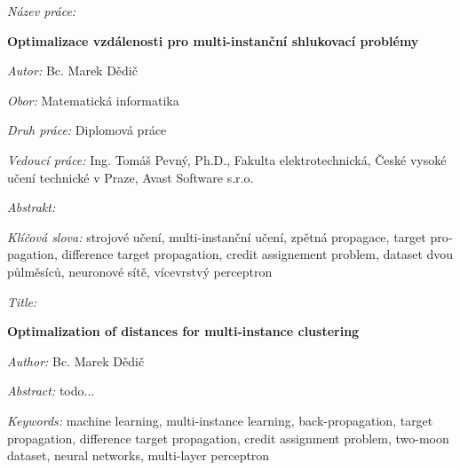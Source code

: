 \begin{czech}
	\begin{onehalfspace}
		\noindent \textit{Název práce:}

		\noindent \textbf{Optimalizace vzdálenosti pro multi-instanční shlukovací problémy}
	\end{onehalfspace}

	\bigskip

	\noindent \textit{Autor:} Bc. Marek Dědič

	\bigskip

	\noindent \textit{Obor:} Matematická informatika

	\bigskip

	\noindent \textit{Druh práce:} Diplomová práce

	\bigskip

	\noindent \textit{Vedoucí práce:} Ing. Tomáš Pevný, Ph.D., Fakulta elektrotechnická, České vysoké učení technické v Praze, Avast Software s.r.o.

	\bigskip

	\noindent \textit{Abstrakt:}
	\todo{...}

	\bigskip

	\noindent \textit{Klíčová slova:}
	strojové učení, multi-instanční učení, zpětná propagace, target propagation, difference target propagation, credit assignement problem, dataset dvou půlměsíců, neuronové sítě, vícevrstvý perceptron \todo{redo}
\end{czech}

\vfill

\begin{onehalfspace}
	\noindent \textit{Title:}

	\noindent \textbf{Optimalization of distances for multi-instance clustering}
\end{onehalfspace}

\bigskip

\noindent \textit{Author:} Bc. Marek Dědič

\bigskip

\noindent \textit{Abstract:}
todo{...}

\bigskip

\noindent \textit{Keywords:}
machine learning, multi-instance learning, back-propagation, target propagation, difference target propagation, credit assignment problem, two-moon dataset, neural networks, multi-layer perceptron 
